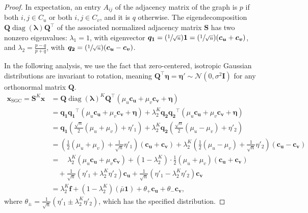 \documentclass{article}
\newcommand{\tp}{{\scriptscriptstyle +}}
\newcommand{\tm}{{\scriptscriptstyle -}}
\DeclareMathOperator{\diag}{diag}
\begin{document}
\begin{proof}
In expectation, an entry $A_{ij}$ of the adjacency matrix of the graph is $p$ if both $i,j \in C_u$ or both $i,j \in C_v$, and it is $q$ otherwise. The eigendecomposition $\bm{Q}\diag(\bm{\lambda})\bm{Q}^\top$ of the associated normalized adjacency matrix $\bm{S}$ has two nonzero eigenvalues: $\lambda_1 = 1$, with eigenvector $\bm{q_1} = (\sfrac{1}{\sqrt{n}})\bm{1} = (\sfrac{1}{\sqrt{n}}) (\bm{c_u} + \bm{c_v})$, and $\lambda_2 = \tfrac{p-q}{p+q}$, with $\bm{q_2} = (\sfrac{1}{\sqrt{n}}) (\bm{c_u} - \bm{c_v})$. 

In the following analysis, we use the fact that zero-centered, isotropic Gaussian distributions are invariant to rotation, meaning $\bm{Q}^\top \bm{\eta} = \bm{\eta}' \sim \mathcal{N}(0, \sigma^2 \bm{I})$ for any orthonormal matrix $\bm{Q}$.
\begin{align*}
    \bm{x}_\text{SGC} = \bm{S}^K \bm{x}
    &= \bm{Q} \diag(\bm{\lambda})^K \bm{Q}^\top ( \mu_u \bm{c_u} + \mu_v \bm{c_v} + \bm{\eta} ) \\
    &= \bm{q_1} \bm{q_1}^\top ( \mu_u \bm{c_u} + \mu_v \bm{c_v} + \bm{\eta} ) + \lambda_2^K \bm{q_2} \bm{q_2}^\top ( \mu_u \bm{c_u} + \mu_v \bm{c_v} + \bm{\eta} ) \\
    &= \bm{q_1} \left( \tfrac{\sqrt{n}}{2} ( \mu_u + \mu_v )  + \eta'_1 \right)
    + \lambda_2^K \bm{q_2} \left( \tfrac{\sqrt{n}}{2} ( \mu_u - \mu_v)  +\eta'_2 \right) \\
    &= \left( \tfrac{1}{2} ( \mu_u + \mu_v )  + \tfrac{1}{\sqrt{n}} \eta'_1 \right) (\bm{c_u} + \bm{c_v})
    + \lambda_2^K \left( \tfrac{1}{2} ( \mu_u - \mu_v)  + \tfrac{1}{\sqrt{n}}\eta'_2 \right) (\bm{c_u} - \bm{c_v}) \\
    &= \quad \lambda_2^K \left( \mu_u \bm{c_u} + \mu_v \bm{c_v} \right)  +
    (1-\lambda_2^K) \cdot \tfrac{1}{2} ( \mu_u + \mu_v ) (\bm{c_u} + \bm{c_v})  \\
    &\quad+ \tfrac{1}{\sqrt{n}} \left( \eta'_1 + \lambda_2^K \eta'_2 \right) \bm{c_u}
    + \tfrac{1}{\sqrt{n}} \left( \eta'_1 - \lambda_2^K \eta'_2 \right) \bm{c_v} \\
    &= \lambda_2^K \bm{f} + (1 - \lambda_2^K) (\bar{\mu} \bm{1}) + \theta_\tp \bm{c_u} + \theta_\tm \bm{c_v},
\end{align*}
%
where $\theta_\pm = \tfrac{1}{\sqrt{n}} ( \eta'_1 \pm \lambda_2^K \eta'_2 )$, which has the specified distribution. 
\end{proof}
\end{document}

